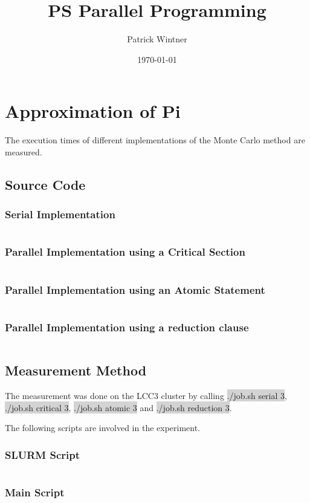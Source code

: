 \documentclass[parskip]{scrartcl}
\title{PS Parallel Programming}
\author{Patrick Wintner}
\date{\today}
\begin{document}
	\maketitle
	
	\section{Approximation of Pi}
	The execution times of different implementations of the Monte Carlo method are measured.
	\subsection{Source Code}
	\subsubsection{Serial Implementation}
	\inputminted	[linenos]{c}{ex1/serial.c}
	\subsubsection{Parallel Implementation using a Critical Section}
	\inputminted	[linenos]{c}{ex1/critical.c}
	\subsubsection{Parallel Implementation using an Atomic Statement}
	\inputminted	[linenos]{c}{ex1/atomic.c}
	\subsubsection{Parallel Implementation using a reduction clause}
	\inputminted	[linenos]{c}{ex1/reduction.c}
	\subsection{Measurement Method}
	The measurement was done on the LCC3 cluster by calling \colorbox{lightgray}{./job.sh serial 3}, \colorbox{lightgray}{./job.sh critical 3}, \colorbox{lightgray}{./job.sh atomic 3} and \colorbox{lightgray}{./job.sh reduction 3}.
	
	The following scripts are involved in the experiment.
	\subsubsection{SLURM Script}
	\inputminted[linenos]{bash}{ex1/job.sh}
	\subsubsection{Main Script}
	\inputminted[linenos]{bash}{ex1/main.sh}
	
\end{document}

